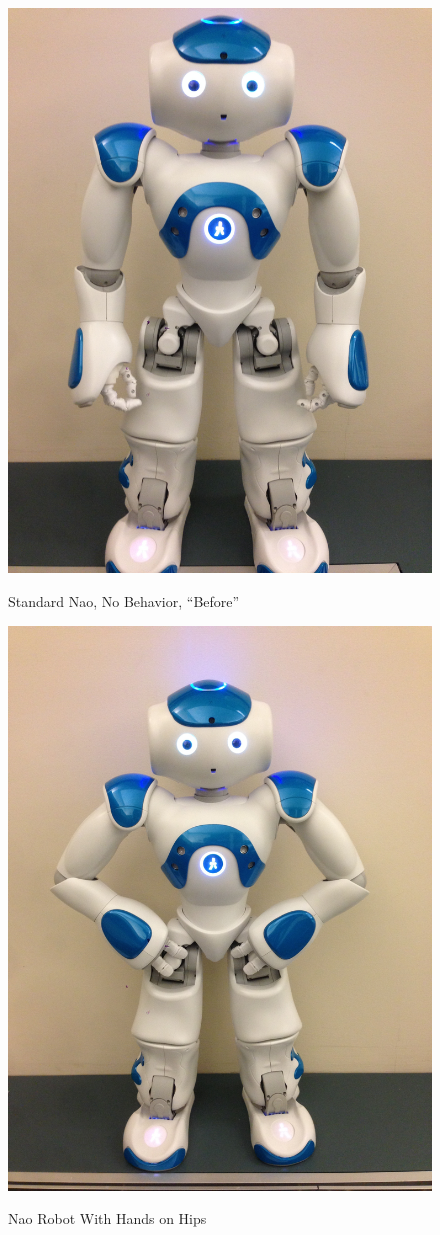 \documentclass{acm_proc_article-sp}
\begin{document}
\begin{figure}[t!]
\centering
 \includegraphics[width=0.65\linewidth]{images/normal3.jpg}\\
 \caption{Standard Nao, No Behavior, ``Before''}
 \label{normal}%
\end{figure}

\begin{figure}[t!]
\centering
 \includegraphics[width=0.65\linewidth]{images/hips7.jpg}\\
 \caption{Nao Robot With Hands on Hips}
 \label{hips} %
\end{figure}
\end{document}
